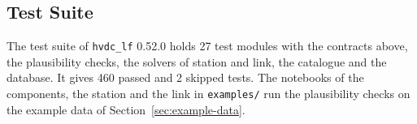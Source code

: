 \subsection{Test Suite}

The test suite of \texttt{hvdc\_lf} 0.52.0 holds 27 test modules with the contracts above, the plausibility checks,
the solvers of station and link, the catalogue and the database. It gives 460 passed and 2 skipped tests. The
notebooks of the components, the station and the link in \texttt{examples/} run the plausibility checks on the
example data of Section~\ref{sec:example-data}.
